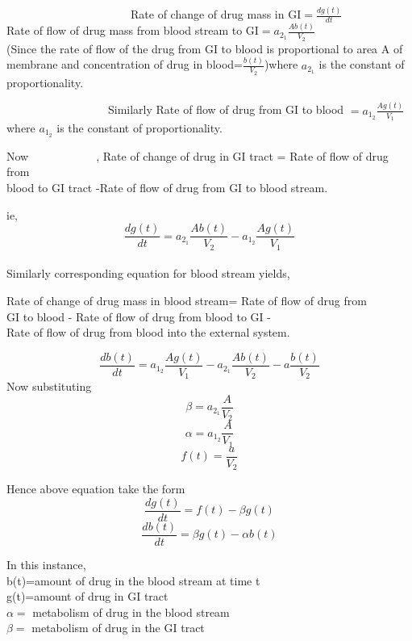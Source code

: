 ~~~~~~~~~~~~~~~~~~~~~~Rate of change of drug mass in GI$= \frac{dg(t)}{dt}$ \\
Rate of flow of drug mass from blood stream to GI$= a_{2_{1}}\frac{Ab(t)}{V_{2}}$ \\


(Since the rate of flow of the drug from GI to blood is proportional to area A of membrane and concentration of drug in blood=$ \frac{b(t)}{V_{2}}$)where $a_{2_{1}}$ is the constant of proportionality.
\par ~~~~~~~~~~~~~~~~~~Similarly Rate of flow of drug from GI to blood $=a_{1_{2}} \frac{Ag(t)}{V_{1}}$ \\ where $a_{1_{2}}$ is the constant of proportionality. 
\linebreak
\\
\begin{flushright}
	Now~~~~~~~~~~~~, Rate of change of drug in GI tract = Rate of flow of drug from\\ blood to GI tract -Rate of flow of drug from GI to blood stream.\\
\end{flushright}
ie, \begin{equation*}
\frac{dg(t)}{dt}=a_{2_{1}}\frac{Ab(t)}{V_{2}}-a_{1_{2}}\frac{Ag(t)}{V_{1}}
\end{equation*}
\\
Similarly corresponding equation for blood stream yields, 
\begin{flushright}
	Rate of change of drug mass in blood stream= Rate of flow of drug from\\ GI to blood - Rate of flow of drug from blood to GI -\\ Rate of flow of drug from blood into the external system.
\end{flushright}
\begin{equation*}
\frac{db(t)}{dt}=a_{1_{2}}\frac{Ag(t)}{V_{1}}-a_{2_{1}}\frac{Ab(t)}{V_{2}}-a\frac{b(t)}{V_{2}}
\end{equation*}
Now substituting   $$\beta=a_{2_{1}}\frac{A}{V_{2}}$$
$$\alpha=a_{1_{2}}\frac{A}{V_{1}}$$
$$f(t)=\frac{a}{V_{2}}$$

Hence above equation take the form
$$\frac{dg(t)}{dt}=f(t)-\beta g(t)$$
$$\frac{db(t)}{dt}=\beta g(t)-\alpha b(t)$$

In this instance,
\\b(t)=amount of drug in the blood stream at time t
\\g(t)=amount of drug in GI tract
\\$\alpha =$ metabolism of drug in the blood stream
\\$\beta =$  metabolism of drug in the GI tract


